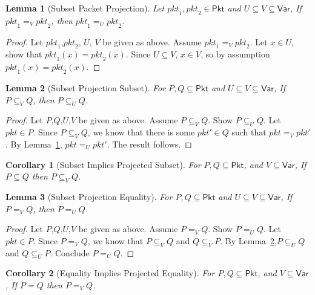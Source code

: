 \documentclass{article}
\newcommand{\pkt}{\mathit{pkt}}
\newcommand{\Pkt}{\mathsf{Pkt}}
\newcommand{\Var}{\mathsf{Var}}
\theoremstyle{plain}
\newtheorem{lemma}{Lemma}
\newtheorem{corollary}{Corollary}
\theoremstyle{definition}
\theoremstyle{remark}
\begin{document}
\begin{lemma}[Subset Packet Projection]
  \label{lem:subset-pkt-proj}
 Let $\pkt_1,\pkt_2 \in \Pkt$ and $U \subseteq V \subseteq \Var$,
  If $\pkt_1 =_V \pkt_2$, then $\pkt_1 =_U \pkt_2$.
\end{lemma}
\begin{proof}
  Let $\pkt_1$,$\pkt_2$, $U$, $V$ be given as above. Assume $\pkt_1 =_V \pkt_2$.
  Let $x \in U$, show that $\pkt_1(x) = \pkt_2(x)$. Since $U \subseteq V$, $x
  \in V$, so by assumption $\pkt_1(x) = \pkt_2(x)$.
\end{proof}

\begin{lemma}[Subset Projection Subset]
  \label{lem:subset-proj-subset}
  For $P,Q \subseteq \Pkt$ and $U \subseteq V \subseteq \Var$,
  If $P \subseteq_V Q$, then $P \subseteq_U Q$.
\end{lemma}

\begin{proof}
  Let $P$,$Q$,$U$,$V$ be given as above. Assume $P \subseteq_V Q$. Show $P
  \subseteq_U Q$. Let $\pkt \in P$. Since $P \subseteq_V Q$, we know that there
  is some $\pkt' \in Q$ such that $\pkt =_V \pkt'$. By Lemma~\ref{lem:subset-pkt-proj},
  $\pkt =_U \pkt'$. The result follows.
\end{proof}


\begin{corollary}[Subset Implies Projected Subset]
  \label{lem:subset-proj}
  For $P,Q \subseteq \Pkt$, and $ V \subseteq \Var$,
  If $P \subseteq Q$ then $P \subseteq_V Q$.
\end{corollary}

\begin{lemma}[Subset Projection Equality]
  \label{lem:subset-proj-equal}
  For $P,Q \subseteq \Pkt$ and $U \subseteq V \subseteq \Var$,
  If $P =_V Q$, then $P =_U Q$.
\end{lemma}

\begin{proof}
  Let $P$,$Q$,$U$,$V$ be given as above. Assume $P =_V Q$. Show $P =_U Q$. Let
  $\pkt \in P$. Since $P =_V Q$, we know that $P \subseteq_V Q$ and $Q
  \subseteq_V P$. By Lemma~\ref{lem:subset-proj-subset},$P \subseteq_U Q$ and $Q
  \subseteq_U P$. Conclude $P =_U Q$.
\end{proof}

\begin{corollary}[Equality Implies Projected Equality]
  \label{lem:equal-proj}
  For $P,Q \subseteq \Pkt$, and $ V \subseteq \Var$, If $P = Q$ then $P =_V Q$.
\end{corollary}
\end{document}
